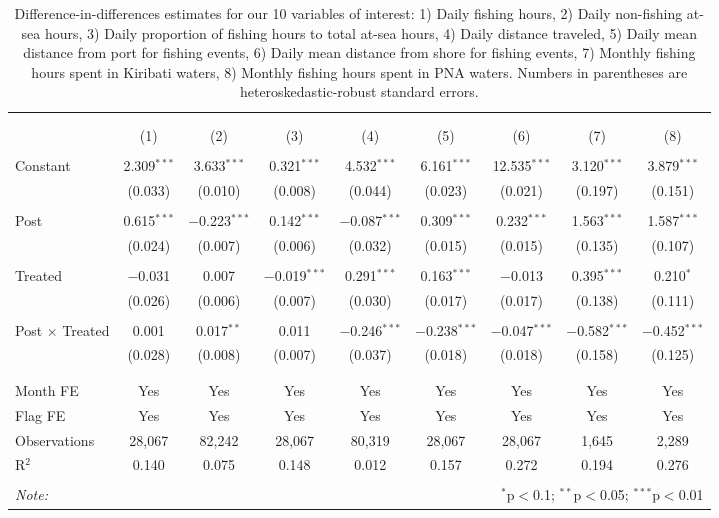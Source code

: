 
\begin{table}[!htbp] \centering 
  \caption{\label{tab:main_DID}Difference-in-differences estimates for our 10 variables of interest: 1) Daily fishing hours, 2) Daily non-fishing at-sea hours, 3) Daily proportion of fishing hours to total at-sea hours, 4) Daily distance traveled, 5) Daily mean distance from port for fishing events, 6) Daily mean distance from shore for fishing events, 7) Monthly fishing hours spent in Kiribati waters, 8) Monthly fishing hours spent in PNA waters. Numbers in parentheses are heteroskedastic-robust standard errors.} 
  \label{} 
\footnotesize 
\begin{tabular}{@{\extracolsep{1pt}}lcccccccc} 
\\[-1.8ex]\hline 
\hline \\[-1.8ex] 
\\[-1.8ex] & (1) & (2) & (3) & (4) & (5) & (6) & (7) & (8)\\ 
\hline \\[-1.8ex] 
 Constant & 2.309$^{***}$ & 3.633$^{***}$ & 0.321$^{***}$ & 4.532$^{***}$ & 6.161$^{***}$ & 12.535$^{***}$ & 3.120$^{***}$ & 3.879$^{***}$ \\ 
  & (0.033) & (0.010) & (0.008) & (0.044) & (0.023) & (0.021) & (0.197) & (0.151) \\ 
  & & & & & & & & \\ 
 Post & 0.615$^{***}$ & $-$0.223$^{***}$ & 0.142$^{***}$ & $-$0.087$^{***}$ & 0.309$^{***}$ & 0.232$^{***}$ & 1.563$^{***}$ & 1.587$^{***}$ \\ 
  & (0.024) & (0.007) & (0.006) & (0.032) & (0.015) & (0.015) & (0.135) & (0.107) \\ 
  & & & & & & & & \\ 
 Treated & $-$0.031 & 0.007 & $-$0.019$^{***}$ & 0.291$^{***}$ & 0.163$^{***}$ & $-$0.013 & 0.395$^{***}$ & 0.210$^{*}$ \\ 
  & (0.026) & (0.006) & (0.007) & (0.030) & (0.017) & (0.017) & (0.138) & (0.111) \\ 
  & & & & & & & & \\ 
 Post $\times$ Treated & 0.001 & 0.017$^{**}$ & 0.011 & $-$0.246$^{***}$ & $-$0.238$^{***}$ & $-$0.047$^{***}$ & $-$0.582$^{***}$ & $-$0.452$^{***}$ \\ 
  & (0.028) & (0.008) & (0.007) & (0.037) & (0.018) & (0.018) & (0.158) & (0.125) \\ 
  & & & & & & & & \\ 
\hline \\[-1.8ex] 
Month FE & Yes & Yes & Yes & Yes & Yes & Yes & Yes & Yes \\ 
Flag FE & Yes & Yes & Yes & Yes & Yes & Yes & Yes & Yes \\ 
Observations & 28,067 & 82,242 & 28,067 & 80,319 & 28,067 & 28,067 & 1,645 & 2,289 \\ 
R$^{2}$ & 0.140 & 0.075 & 0.148 & 0.012 & 0.157 & 0.272 & 0.194 & 0.276 \\ 
\hline 
\hline \\[-1.8ex] 
\textit{Note:}  & \multicolumn{8}{r}{$^{*}$p$<$0.1; $^{**}$p$<$0.05; $^{***}$p$<$0.01} \\ 
\end{tabular} 
\end{table} 

